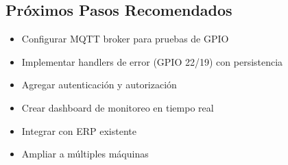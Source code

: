 \subsection{Próximos Pasos Recomendados}

\begin{itemize}
    \item Configurar MQTT broker para pruebas de GPIO
    \item Implementar handlers de error (GPIO 22/19) con persistencia
    \item Agregar autenticación y autorización
    \item Crear dashboard de monitoreo en tiempo real
    \item Integrar con ERP existente
    \item Ampliar a múltiples máquinas
\end{itemize}
